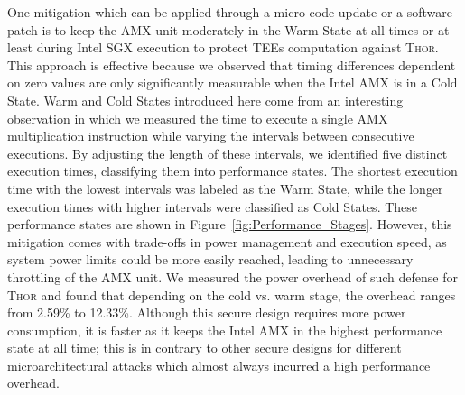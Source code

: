 One mitigation which can be applied through a micro-code update or a software patch is to keep the AMX unit moderately in the Warm State at all times or at least during Intel SGX execution to protect TEEs computation against \textsc{Thor}.
%
This approach is effective because we observed that timing differences dependent on zero values are only significantly measurable when the Intel AMX is in a Cold State. Warm and Cold States introduced here come from an interesting observation in which 
we measured the time to execute a single AMX multiplication instruction while varying the intervals between consecutive executions. By adjusting the length of these intervals, we identified five distinct execution times, classifying them into performance states. The shortest execution time with the lowest intervals was labeled as the Warm State, while the longer execution times with higher intervals were classified as Cold States.  These performance states are shown in Figure~\ref{fig:Performance_Stages}.
However, this mitigation comes with trade-offs in power management and execution speed, as system power limits could be more easily reached, leading to unnecessary throttling of the AMX unit. We measured the power overhead of such defense for \textsc{Thor} and found that depending on the cold vs. warm stage,  the overhead ranges from 2.59\% to 12.33\%. Although this secure design requires more power consumption, it is faster as it keeps the Intel AMX in the highest performance state at all time; this is in contrary to other secure designs for different microarchitectural attacks which almost always incurred a high performance overhead. 


